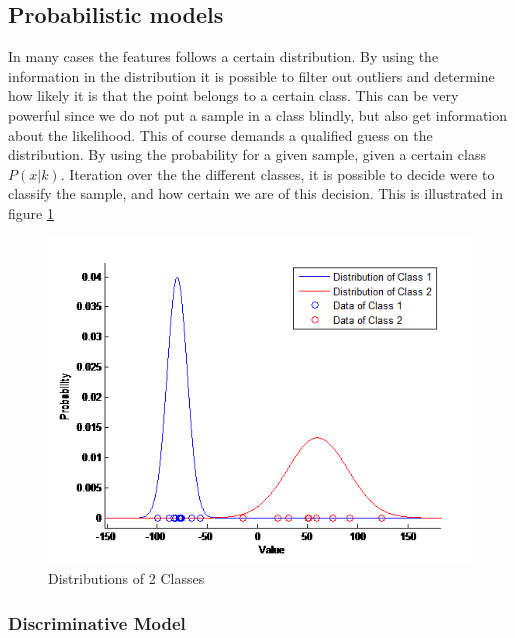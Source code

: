 \subsection{Probabilistic models}
In many cases the features follows a certain distribution. By using the information in the distribution it is possible to filter out outliers and determine how likely it is that the point belongs to a certain class. This can be very powerful since we do not put a sample in a class blindly, but also get information about the likelihood. This of course demands a qualified guess on the distribution. 
By using the probability for a given sample, given a certain class $P(x|k)$. Iteration over the the different classes, it is possible to decide were to classify the sample, and how certain we are of this decision. This is illustrated in figure \ref{fig:disex} 

\begin{figure}[H]
\centering
\includegraphics[scale=0.8]{billeder/DisEx}
\caption{Distributions of 2 Classes}
\label{fig:disex}
\end{figure}

\subsubsection{Discriminative Model}

